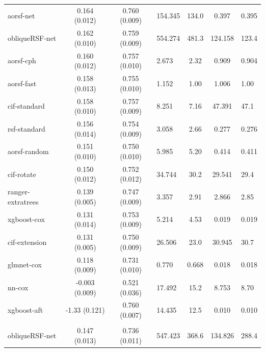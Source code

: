 \documentclass[twoside,11pt]{article}\usepackage[]{graphicx}\usepackage[]{xcolor}
\newenvironment{knitrout}{}{} %
\begin{document}
\begin{knitrout}
\begin{longtable}{lcclccl}
\hline
\hspace{1em}aorsf-net & 0.164 (0.012) & 0.760 (0.009) & 154.345 & 134.0 & 0.397 & 0.395\\
\hspace{1em}obliqueRSF-net & 0.162 (0.010) & 0.759 (0.009) & 554.274 & 481.3 & 124.158 & 123.4\\
\hspace{1em}aorsf-cph & 0.160 (0.012) & 0.757 (0.010) & 2.673 & 2.32 & 0.909 & 0.904\\
\hspace{1em}aorsf-fast & 0.158 (0.013) & 0.755 (0.010) & 1.152 & 1.00 & 1.006 & 1.00\\
\hspace{1em}cif-standard & 0.158 (0.010) & 0.757 (0.009) & 8.251 & 7.16 & 47.391 & 47.1\\
\hspace{1em}rsf-standard & 0.156 (0.014) & 0.754 (0.009) & 3.058 & 2.66 & 0.277 & 0.276\\
\hspace{1em}aorsf-random & 0.151 (0.010) & 0.750 (0.010) & 5.985 & 5.20 & 0.414 & 0.411\\
\hspace{1em}cif-rotate & 0.150 (0.012) & 0.752 (0.012) & 34.744 & 30.2 & 29.541 & 29.4\\
\hspace{1em}ranger-extratrees & 0.139 (0.005) & 0.747 (0.009) & 3.357 & 2.91 & 2.866 & 2.85\\
\hspace{1em}xgboost-cox & 0.131 (0.014) & 0.753 (0.009) & 5.214 & 4.53 & 0.019 & 0.019\\
\hspace{1em}cif-extension & 0.131 (0.005) & 0.750 (0.009) & 26.506 & 23.0 & 30.945 & 30.7\\
\hspace{1em}glmnet-cox & 0.118 (0.009) & 0.731 (0.010) & 0.770 & 0.668 & 0.018 & 0.018\\
\hspace{1em}nn-cox & -0.003 (0.009) & 0.521 (0.036) & 17.492 & 15.2 & 8.753 & 8.70\\
\hspace{1em}xgboost-aft & -1.33 (0.121) & 0.760 (0.007) & 14.435 & 12.5 & 0.010 & 0.010\\
\addlinespace[0.3em]
\hline
\multicolumn{7}{l}{\textit{\textbf{Rotterdam tumor bank; recurrence, n = 2982, p = 11}}}\\
\hline
\hspace{1em}obliqueRSF-net & 0.147 (0.013) & 0.736 (0.011) & 547.423 & 368.6 & 134.826 & 288.4\\

\end{longtable}
\end{knitrout}
\end{document}
